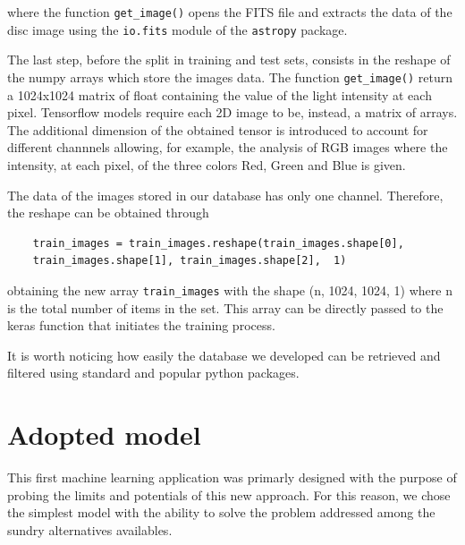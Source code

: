 \documentclass[a4paper,10pt]{report}
\begin{document}
where the function \lstinline{get_image()} opens the FITS file 
and extracts
the data of the disc image using the \lstinline{io.fits} module of 
the \lstinline{astropy} package.

The last step, before the split in training and test sets, consists 
in the reshape of the numpy arrays which store the images data. The  
function \lstinline{get_image()} return a 1024x1024 matrix of float containing
the value of the light intensity at each pixel. 
Tensorflow models require each 2D image to be, instead, a matrix of arrays.
The additional dimension of the obtained tensor is introduced to account for 
different channnels allowing, for example, the analysis of RGB images where 
the intensity, at each pixel, of the three colors Red, Green and Blue is given.

The data of the images stored in our database has only one channel. Therefore,
the reshape can be obtained through

\begin{lstlisting}
    train_images = train_images.reshape(train_images.shape[0], 
    train_images.shape[1], train_images.shape[2],  1)
\end{lstlisting}

obtaining the new array \lstinline{train_images} with the shape (n, 1024, 1024, 1)
where n is the total number of items in the set.
This array can be directly passed to the keras function that initiates
the training process.

It is worth noticing how easily the database we developed can be retrieved and filtered
using standard and popular python packages.

\section{Adopted model}

This first machine learning application was primarly designed with the purpose of probing the limits and potentials
of this new approach. For this reason, we chose the simplest model with the ability to solve the problem addressed among the
sundry alternatives availables.
\end{document}

